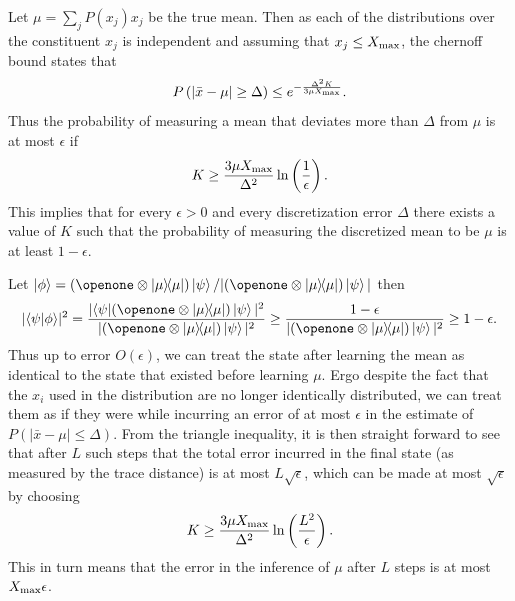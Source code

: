 \documentclass[aps,amsmath,onecolumn,amssymb]{revtex4}
\begin{document}
Let $\mu= \sum_j P(x_j) x_j$ be the true mean.  Then as each of the distributions over the constituent $x_j$ is independent and assuming that $x_j \le X_{\rm max}$, the chernoff bound states that
\begin{equation}
P\left(\left|\bar{x} - \mu\right|\ge \Delta \right)\le e^{-\frac{\Delta^2 K}{3\mu X_{\rm max}}}.
\end{equation}
Thus the probability of measuring a mean that deviates more than $\Delta$ from $\mu$ is at most $\epsilon$ if
\begin{equation}
K\ge \frac{3\mu X_{\rm max}}{\Delta^2}\ln\left(\frac{1}{\epsilon} \right).
\end{equation}
This implies that for every $\epsilon>0$ and every discretization error $\Delta$ there exists a value of $K$ such that the probability of measuring the discretized mean to be $\mu$ is at least $1-\epsilon$.

Let $\ket{\phi} = (\openone \otimes \ketbra{\mu}{\mu}) \ket{\psi} / |(\openone \otimes \ketbra{\mu}{\mu}) \ket{\psi}|$ then
\begin{equation}
|\braket{\psi}{\phi}|^2 = \frac{|\bra{\psi} (\openone \otimes \ketbra{\mu}{\mu}) \ket{\psi}|^2}{|(\openone \otimes \ketbra{\mu}{\mu}) \ket{\psi}|^2} \ge \frac{1-\epsilon}{|(\openone \otimes \ketbra{\mu}{\mu}) \ket{\psi}|^2} \ge 1-\epsilon.
\end{equation}
Thus up to error $O(\epsilon)$, we can treat the state after learning the mean as identical to the state that existed before learning $\mu$.  Ergo despite the fact that the $x_i$ used in the distribution are no longer identically distributed, we can treat them as if they were while incurring an error of at most $\epsilon$ in the estimate of $P(|\bar{x} - \mu|\le \Delta)$.  
From the triangle inequality, it is then straight forward to see that after $L$ such steps that the total error incurred in the final state (as measured by the trace distance) is at most $L\sqrt{\epsilon}$, which can be made at most $\sqrt{\epsilon}$ by choosing 
\begin{equation}
K\ge \frac{3\mu X_{\rm max}}{\Delta^2}\ln\left(\frac{L^2}{\epsilon} \right).
\end{equation}
This in turn means that the error in the inference of $\mu$ after $L$ steps is at most $X_{\rm max} \epsilon$.
\end{document}

